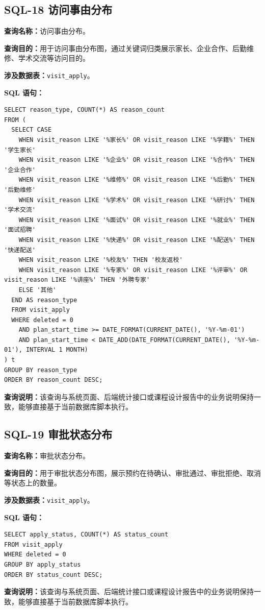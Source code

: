 \subsection{SQL-18 访问事由分布}
\textbf{查询名称：}访问事由分布。\par
\textbf{查询目的：}用于访问事由分布图，通过关键词归类展示家长、企业合作、后勤维修、学术交流等访问目的。\par
\textbf{涉及数据表：}\texttt{visit\_apply}。\par
\textbf{SQL 语句：}
\begin{lstlisting}[style=sqlstyle]
SELECT reason_type, COUNT(*) AS reason_count
FROM (
  SELECT CASE
    WHEN visit_reason LIKE '%家长%' OR visit_reason LIKE '%学籍%' THEN '学生家长'
    WHEN visit_reason LIKE '%企业%' OR visit_reason LIKE '%合作%' THEN '企业合作'
    WHEN visit_reason LIKE '%维修%' OR visit_reason LIKE '%后勤%' THEN '后勤维修'
    WHEN visit_reason LIKE '%学术%' OR visit_reason LIKE '%研讨%' THEN '学术交流'
    WHEN visit_reason LIKE '%面试%' OR visit_reason LIKE '%就业%' THEN '面试招聘'
    WHEN visit_reason LIKE '%快递%' OR visit_reason LIKE '%配送%' THEN '快递配送'
    WHEN visit_reason LIKE '%校友%' THEN '校友返校'
    WHEN visit_reason LIKE '%专家%' OR visit_reason LIKE '%评审%' OR visit_reason LIKE '%讲座%' THEN '外聘专家'
    ELSE '其他'
  END AS reason_type
  FROM visit_apply
  WHERE deleted = 0
    AND plan_start_time >= DATE_FORMAT(CURRENT_DATE(), '%Y-%m-01')
    AND plan_start_time < DATE_ADD(DATE_FORMAT(CURRENT_DATE(), '%Y-%m-01'), INTERVAL 1 MONTH)
) t
GROUP BY reason_type
ORDER BY reason_count DESC;
\end{lstlisting}
\textbf{查询说明：}该查询与系统页面、后端统计接口或课程设计报告中的业务说明保持一致，能够直接基于当前数据库脚本执行。

\subsection{SQL-19 审批状态分布}
\textbf{查询名称：}审批状态分布。\par
\textbf{查询目的：}用于审批状态分布图，展示预约在待确认、审批通过、审批拒绝、取消等状态上的数量。\par
\textbf{涉及数据表：}\texttt{visit\_apply}。\par
\textbf{SQL 语句：}
\begin{lstlisting}[style=sqlstyle]
SELECT apply_status, COUNT(*) AS status_count
FROM visit_apply
WHERE deleted = 0
GROUP BY apply_status
ORDER BY status_count DESC;
\end{lstlisting}
\textbf{查询说明：}该查询与系统页面、后端统计接口或课程设计报告中的业务说明保持一致，能够直接基于当前数据库脚本执行。

